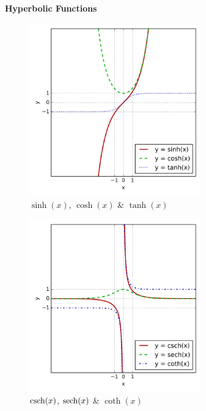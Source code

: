 \begingroup
\begin{center}
\fontsize{15}{15}\sffamily\selectfont
\textbf{Hyperbolic Functions}
\end{center}
\endgroup

\begin{table}[H]
    \centering
    \begin{minipage}[t]{0.45\linewidth}
        \begin{figure}[H]
            \centering
            \includegraphics[height=7.5cm]{Pictures/maths/Sinh_cosh_tanh.jpg}
            \caption{$\sinh(x)$, $\cosh(x)$ \& $\tanh(x)$}
        \end{figure}        
    \end{minipage}
    \hfill
    \begin{minipage}[t]{0.45\linewidth}
        \begin{figure}[H]
            \centering
            \includegraphics[height=7.5cm]{Pictures/maths/Csch_sech_coth.jpg}
            \caption{$\operatorname{csch}(x)$, $\operatorname{sech}(x)$ \& $\coth(x)$}
        \end{figure}
    \end{minipage}
\end{table}

